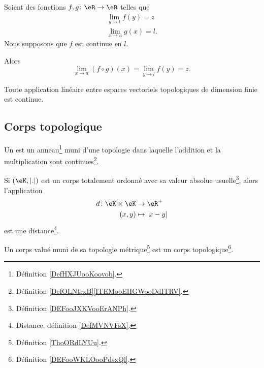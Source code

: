 \begin{proposition}       \label{PROPooKNVHooXlQyVA}
	Soient des fonctions \( f,g\colon \eR\to \eR\) telles que
	\begin{subequations}
		\begin{align}
			\lim_{y\to l} f(y)=z \\
			\lim_{x\to a} g(x)=l.
		\end{align}
	\end{subequations}
	Nous supposons que \( f\) est continue en \( l\).

	Alors
	\begin{equation}
		\lim_{x\to a} (f\circ g)(x)=\lim_{y\to l} f(y)=z.
	\end{equation}
\end{proposition}

\begin{proposition}     \label{PROPooBEHTooBrLWuh}
	Toute application linéaire entre espaces vectoriels topologiques de dimension finie est continue.
\end{proposition}

\subsection{Corps topologique}

\begin{definition}      \label{DEFooWKLOooPdsxQl}
	Un  est un anneau\footnote{Définition \ref{DefHXJUooKoovob}.} muni d'une topologie dans laquelle l'addition et la multiplication sont continues\footnote{Définition \ref{DefOLNtrxB}\ref{ITEMooEHGWooDdITRV}.}.
\end{definition}

\begin{propositionDef}      \label{PROPooAWAKooKRmbGT}
	Si \( (\eK, | . |)\) est un corps totalement ordonné avec sa valeur absolue usuelle\footnote{Définition \ref{DEFooJXKVooErANPh}.}, alors l'application
	\begin{equation}
		\begin{aligned}
			d\colon \eK\times \eK & \to \eR^+       \\
			(x,y)                 & \mapsto | x-y |
		\end{aligned}
	\end{equation}
	est une distance\footnote{Distance, définition \ref{DefMVNVFsX}.}.

	Un corps valué muni de sa topologie métrique\footnote{Définition \ref{ThoORdLYUu}.} est un corps topologique\footnote{Définition \ref{DEFooWKLOooPdsxQl}.}.
\end{propositionDef}


